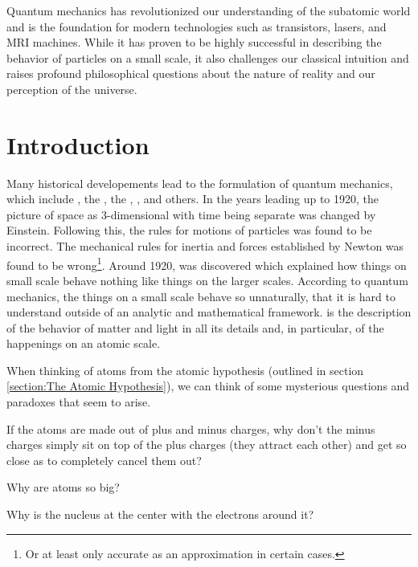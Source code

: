 Quantum mechanics has revolutionized our understanding of the subatomic world and is the foundation for modern technologies such as transistors, lasers, and MRI machines. While it has proven to be highly successful in describing the behavior of particles on a small scale, it also challenges our classical intuition and raises profound philosophical questions about the nature of reality and our perception of the universe.





\section{Introduction}

Many historical developements lead to the formulation of quantum mechanics, which include , the , the , , and others. In the years leading up to 1920, the picture of space as 3-dimensional with time being separate was changed by Einstein. Following this, the rules for motions of particles was found to be incorrect. The mechanical rules for inertia and forces established by Newton was found to be wrong\footnote{Or at least only accurate as an approximation in certain cases.}. Around 1920,  was discovered which explained how things on small scale behave nothing like things on the larger scales. According to quantum mechanics, the things on a small scale behave so unnaturally, that it is hard to understand outside of an analytic and mathematical framework.  is the description of the behavior of matter and light in all its details and, in particular, of the happenings on an atomic scale. 

When thinking of atoms from the atomic hypothesis (outlined in section \ref{section:The Atomic Hypothesis}), we can think of some mysterious questions and paradoxes that seem to arise.

\begin{questions}
	\item If the atoms are made out of plus and minus charges, why don’t the minus charges simply sit on top of the plus charges (they attract each other) and get so close as to completely cancel them out? 
	\item Why are atoms so big? 
	\item Why is the nucleus at the center with the electrons around it?
\end{questions}


